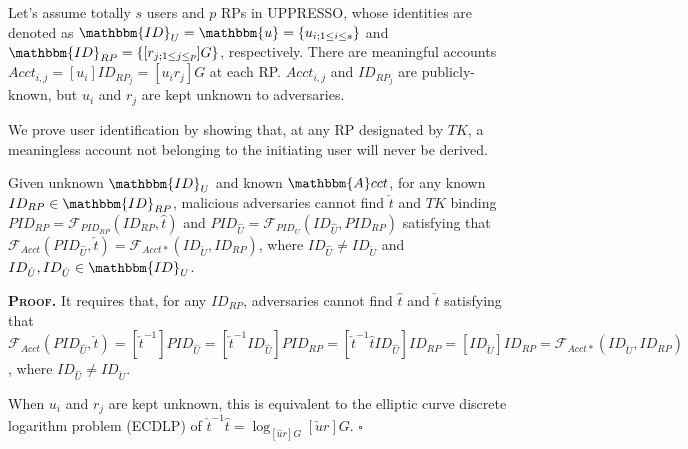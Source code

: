 Let's assume totally $s$ users and $p$ RPs in UPPRESSO,
    whose identities are denoted as $\mathbbm{ID}_U = \mathbbm{u} = \{u_{i; 1 \leq i \leq s}\}$ and $\mathbbm{ID}_{RP} = \{[r_{j;1 \leq j \leq p}]G\}$, respectively.
There are meaningful accounts $Acct_{i,j}=[u_i]ID_{RP_j} = [u_i r_j]G$ at each RP.
$Acct_{i,j}$ and $ID_{RP_j}$ are publicly-known, but $u_{i}$ and $r_{j}$ are kept unknown to adversaries.




We prove user identification by showing that,
    at any RP designated by $TK$,
        a meaningless account not belonging to the initiating user will never be derived.

\begin{thm} Given unknown $\mathbbm{ID}_U$ and known $\mathbbm{A}cct$,
for any known $ID_{RP} \in \mathbbm{ID}_{RP}$, 
     malicious adversaries cannot find $\check{t}$ and $TK$ binding $PID_{RP} = \mathcal{F}_{PID_{RP}}(ID_{RP}, \hat{t})$
     and $PID_{\hat{U}}=\mathcal{F}_{PID_U}(ID_{\hat{U}}, PID_{RP})$ satisfying that $\mathcal{F}_{Acct}(PID_{\hat{U}}, \check{t}) = \mathcal{F}_{Acct\ast}(ID_{\check{U}}, ID_{RP})$, where $ID_{\hat{U}} \neq ID_{\check{U}}$ and $ID_{\hat{U}},ID_{\check{U}} \in \mathbbm{ID}_U$.
\label{thm-u-id}
\end{thm}

\noindent\textbf{\textsc{Proof.}}
It requires that, for any $ID_{RP}$, adversaries cannot find $\hat{t}$ and $\check{t}$ satisfying that $\mathcal{F}_{Acct}(PID_{\hat{U}}, \check{t}) = [\check{t}^{-1}]PID_{\hat{U}} = [\check{t}^{-1}ID_{\hat{U}}]PID_{RP}
= [\check{t}^{-1}\hat{t}ID_{\hat{U}}]ID_{RP}
    = [ID_{\check{U}}]ID_{RP} = \mathcal{F}_{Acct\ast}(ID_{\check{U}}, ID_{RP})$,
where $ID_{\hat{U}} \neq ID_{\check{U}}$.

When $u_{i}$ and $r_{j}$ are kept unknown, this is equivalent to the elliptic curve discrete logarithm problem (ECDLP) of $\check{t}^{-1}\hat{t} = \log_{[\hat{u}r]G}{[\check{u}r]G}$.
\hfill $\square$
\vspace{1.5mm}

